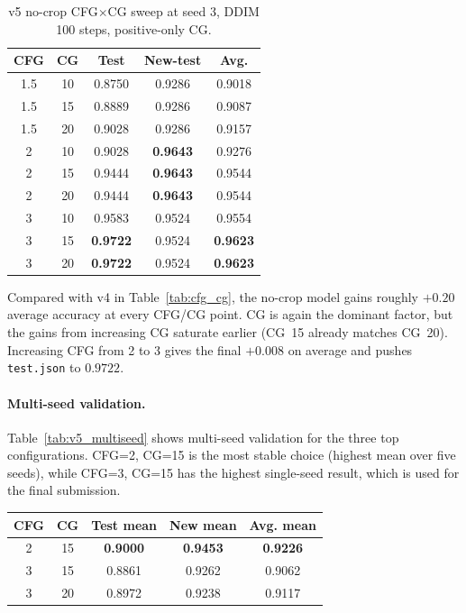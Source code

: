 \documentclass[10pt,twocolumn,letterpaper]{article}
\begin{document}
\begin{table}[h]
\centering
\begin{tabular}{ccccc}
\toprule
CFG & CG & Test & New-test & Avg. \\
\midrule
1.5 & 10 & 0.8750 & 0.9286 & 0.9018 \\
1.5 & 15 & 0.8889 & 0.9286 & 0.9087 \\
1.5 & 20 & 0.9028 & 0.9286 & 0.9157 \\
2 & 10 & 0.9028 & \cellcolor{yellow!25}\textbf{0.9643} & 0.9276 \\
2 & 15 & 0.9444 & \cellcolor{yellow!25}\textbf{0.9643} & 0.9544 \\
2 & 20 & 0.9444 & \cellcolor{yellow!25}\textbf{0.9643} & 0.9544 \\
3 & 10 & 0.9583 & 0.9524 & 0.9554 \\
3 & 15 & \cellcolor{yellow!25}\textbf{0.9722} & 0.9524 & \cellcolor{yellow!25}\textbf{0.9623} \\
3 & 20 & \cellcolor{yellow!25}\textbf{0.9722} & 0.9524 & \cellcolor{yellow!25}\textbf{0.9623} \\
\bottomrule
\end{tabular}
\caption{v5 no-crop CFG$\times$CG sweep at seed 3, DDIM 100 steps, positive-only CG.}
\label{tab:v5_seed3}
\end{table}

Compared with v4 in Table~\ref{tab:cfg_cg}, the no-crop model gains roughly $+0.20$ average accuracy at every CFG/CG point. CG is again the dominant factor, but the gains from increasing CG saturate earlier (CG~15 already matches CG~20). Increasing CFG from 2 to 3 gives the final $+0.008$ on average and pushes \texttt{test.json} to $0.9722$.

\paragraph{Multi-seed validation.}
Table~\ref{tab:v5_multiseed} shows multi-seed validation for the three top configurations. CFG=2, CG=15 is the most stable choice (highest mean over five seeds), while CFG=3, CG=15 has the highest single-seed result, which is used for the final submission.

\begin{center}
\small
\setlength{\tabcolsep}{3pt}
\begin{tabular}{ccccc}
\toprule
CFG & CG & Test mean & New mean & Avg. mean \\
\midrule
2 & 15 & \cellcolor{yellow!25}\textbf{0.9000} & \cellcolor{yellow!25}\textbf{0.9453} & \cellcolor{yellow!25}\textbf{0.9226} \\
3 & 15 & 0.8861 & 0.9262 & 0.9062 \\
3 & 20 & 0.8972 & 0.9238 & 0.9117 \\
\bottomrule
\end{tabular}
\label{tab:v5_multiseed}
\end{center}
\end{document}
